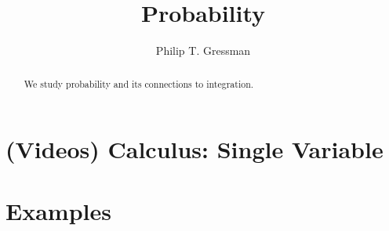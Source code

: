 \documentclass{ximera}
\title{Probability}
\author{Philip T. Gressman}
\begin{document}
\begin{abstract}
  We study probability and its connections to integration.
\end{abstract}
\maketitle

\section*{(Videos) Calculus: Single Variable}

\section*{Examples}

\begin{example}

\end{example}

\begin{example}

\end{example}
\end{document}
